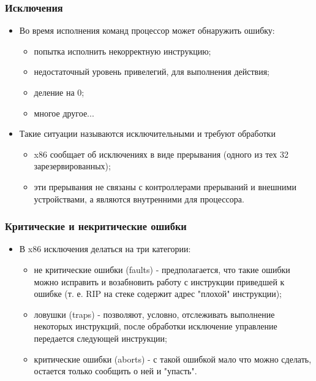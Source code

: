 \begin{frame}
\frametitle{Исключения}
\begin{itemize}
  \item Во время исполнения команд процессор может обнаружить ошибку:
  \begin{itemize}
    \item попытка исполнить некорректную инструкцию;
    \item недостаточный уровень привелегий, для выполнения действия;
    \item деление на 0;
    \item многое другое...
  \end{itemize}
  \item Такие ситуации называются исключительными и требуют обработки
  \begin{itemize}
    \item x86 сообщает об исключениях в виде прерывания (одного из тех 32
    зарезервированных);
    \item эти прерывания не связаны с контроллерами прерываний и внешними
    устройствами, а являются внутренними для процессора.
  \end{itemize}
\end{itemize}
\end{frame}

\begin{frame}
\frametitle{Критические и некритические ошибки}
\begin{itemize}
  \item В x86 исключения делаться на три категории:
  \begin{itemize}
    \item не критические ошибки (faults) - предполагается, что такие ошибки
    можно исправить и возабновить работу с инструкции приведшей к ошибке (т. е.
    RIP на стеке содержит адрес "плохой" инструкции);
    \item ловушки (traps) - позволяют, условно, отслеживать выполнение некоторых
    инструкций, после обработки исключение управление передается следующей
    инструкции;
    \item критические ошибки (aborts) - с такой ошибкой мало что можно сделать,
    остается только сообщить о ней и "упасть".
  \end{itemize}
\end{itemize}
\end{frame}

